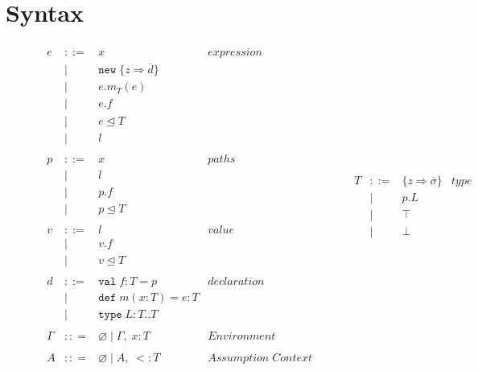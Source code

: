 \documentclass{llncs}
\numberwithin{subcase}{case}
\numberwithin{case}{theorem}
\numberwithin{case}{lemma}
\begin{document}
\section{Syntax}

\begin{figure}[h]
\[
\begin{array}{lll}
\begin{array}{lllr}
e & ::= & x & expression \\
& | & \texttt{new} \; \{z \Rightarrow \overline{d}\}&\\
& | & e.m_T(e) &\\
& | & e.f &\\
& | & e \unlhd T&\\
& | & l &\\
&&\\
p & ::= & x & paths \\
& | & l &\\
& | & p.f &\\
& | & p \unlhd T &\\
&&\\
v & ::= & l & value \\
& | & v.f &\\
& | & v \unlhd T &\\
&&\\
d & ::= & \texttt{val} \; f : T = p & declaration \\
  & |   & \texttt{def} \; m(x:T) = e : T &\\
  & |   & \texttt{type} \; L : T .. T&\\
&&\\
\Gamma & :: = & \varnothing \; | \; \Gamma,\; x : T & Environment \\
&&\\
A & :: = & \varnothing \; | \; A,\;  <: T & Assumption \; Context \\
 \end{array}
& ~~~~~~
&
\begin{array}{lllr}
T & ::= & \{z \Rightarrow \overline{\sigma}\} & type \\
& | & p.L &\\
& | & \top & \\
& | & \bot & \\

\end{array}
\end{array}\]
\end{figure}
\end{document}
